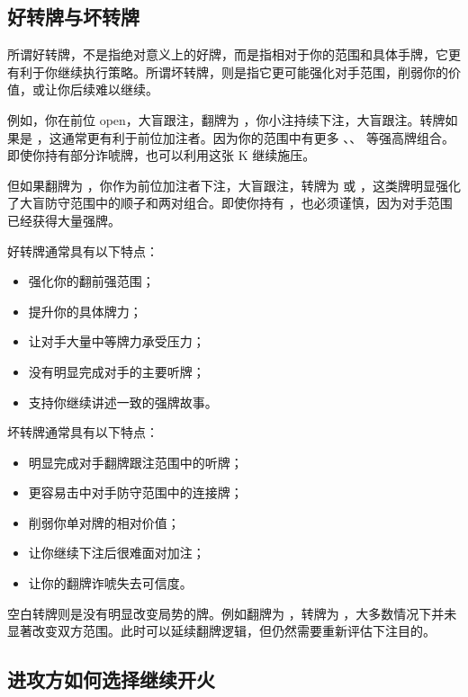 \subsection{好转牌与坏转牌}

所谓好转牌，不是指绝对意义上的好牌，而是指相对于你的范围和具体手牌，它更有利于你继续执行策略。所谓坏转牌，则是指它更可能强化对手范围，削弱你的价值，或让你后续难以继续。

例如，你在前位 open，大盲跟注，翻牌为 ，你小注持续下注，大盲跟注。转牌如果是 ，这通常更有利于前位加注者。因为你的范围中有更多 、、 等强高牌组合。即使你持有部分诈唬牌，也可以利用这张 K 继续施压。

但如果翻牌为 ，你作为前位加注者下注，大盲跟注，转牌为  或 ，这类牌明显强化了大盲防守范围中的顺子和两对组合。即使你持有 ，也必须谨慎，因为对手范围已经获得大量强牌。

好转牌通常具有以下特点：

\begin{itemize}
\item 强化你的翻前强范围；
\item 提升你的具体牌力；
\item 让对手大量中等牌力承受压力；
\item 没有明显完成对手的主要听牌；
\item 支持你继续讲述一致的强牌故事。
\end{itemize}

坏转牌通常具有以下特点：

\begin{itemize}
\item 明显完成对手翻牌跟注范围中的听牌；
\item 更容易击中对手防守范围中的连接牌；
\item 削弱你单对牌的相对价值；
\item 让你继续下注后很难面对加注；
\item 让你的翻牌诈唬失去可信度。
\end{itemize}

空白转牌则是没有明显改变局势的牌。例如翻牌为 ，转牌为 ，大多数情况下并未显著改变双方范围。此时可以延续翻牌逻辑，但仍然需要重新评估下注目的。

\subsection{进攻方如何选择继续开火}

